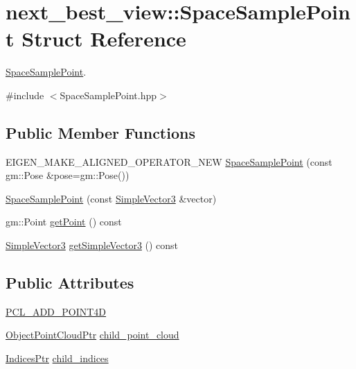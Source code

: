\hypertarget{structnext__best__view_1_1SpaceSamplePoint}{\section{next\-\_\-best\-\_\-view\-:\-:\-Space\-Sample\-Point \-Struct \-Reference}
\label{structnext__best__view_1_1SpaceSamplePoint}
}


\hyperlink{structnext__best__view_1_1SpaceSamplePoint}{\-Space\-Sample\-Point}.  




{\ttfamily \#include $<$\-Space\-Sample\-Point.\-hpp$>$}

\subsection*{\-Public \-Member \-Functions}
\begin{DoxyCompactItemize}
\item 
\-E\-I\-G\-E\-N\-\_\-\-M\-A\-K\-E\-\_\-\-A\-L\-I\-G\-N\-E\-D\-\_\-\-O\-P\-E\-R\-A\-T\-O\-R\-\_\-\-N\-E\-W \hyperlink{structnext__best__view_1_1SpaceSamplePoint_ad720803aae441b509ddbc17c72f6ce63}{\-Space\-Sample\-Point} (const gm\-::\-Pose \&pose=gm\-::\-Pose())
\item 
\hyperlink{structnext__best__view_1_1SpaceSamplePoint_a180d50e60465d7115fe87a2b4ac8b096}{\-Space\-Sample\-Point} (const \hyperlink{namespacenext__best__view_a59fc75b908e198bc02a9b19ba88edf12}{\-Simple\-Vector3} \&vector)
\item 
gm\-::\-Point \hyperlink{structnext__best__view_1_1SpaceSamplePoint_aa1a9f2568e751077608a5e66a5e23f75}{get\-Point} () const 
\item 
\hyperlink{namespacenext__best__view_a59fc75b908e198bc02a9b19ba88edf12}{\-Simple\-Vector3} \hyperlink{structnext__best__view_1_1SpaceSamplePoint_af44aaaef75625b5bb3b4c87571cadc8e}{get\-Simple\-Vector3} () const 
\end{DoxyCompactItemize}
\subsection*{\-Public \-Attributes}
\begin{DoxyCompactItemize}
\item 
\hyperlink{structnext__best__view_1_1SpaceSamplePoint_ab0f2b016f72449cfbbe6d0455b94539b}{\-P\-C\-L\-\_\-\-A\-D\-D\-\_\-\-P\-O\-I\-N\-T4\-D}
\item 
\hyperlink{namespacenext__best__view_af8b3b448f67ab117bb7c59bc7c34f0b3}{\-Object\-Point\-Cloud\-Ptr} \hyperlink{structnext__best__view_1_1SpaceSamplePoint_a855b713a529b6c82f7d0bb2009f2eb7f}{child\-\_\-point\-\_\-cloud}
\item 
\hyperlink{namespacenext__best__view_a89edd5f370254b5c7689adfede9fe6a7}{\-Indices\-Ptr} \hyperlink{structnext__best__view_1_1SpaceSamplePoint_a7b446e4d8cfafbdca312955c7f142a61}{child\-\_\-indices}
\end{DoxyCompactItemize}


